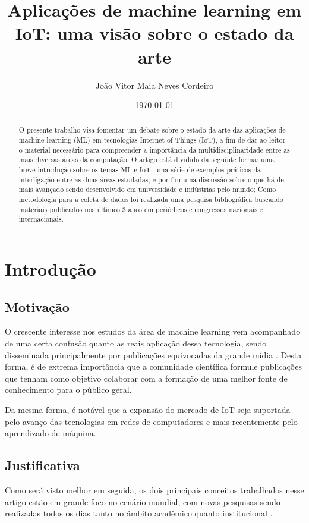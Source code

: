 \documentclass[12pt]{article}
\author{João Vitor Maia Neves Cordeiro}
\title{Aplicações de machine learning em IoT: uma visão sobre o estado da arte}
\date{\today}
\begin{document}
\maketitle

\begin{abstract}

O presente trabalho visa fomentar um debate sobre o estado da arte das aplicações de machine learning (ML) em tecnologias Internet of Things (IoT), a fim de dar ao leitor o material necessário para compreender a importância da multidisciplinaridade entre as mais diversas áreas da computação; O artigo está dividido da seguinte forma: uma breve introdução sobre os temas ML e IoT; uma série de exemplos práticos da interligação entre as duas áreas estudadas; e por fim uma discussão sobre o que há de mais avançado sendo desenvolvido em universidade e indústrias pelo mundo; Como metodologia para a coleta de dados foi realizada uma pesquisa bibliográfica buscando materiais publicados nos últimos 3 anos em periódicos e congressos nacionais e internacionais.

\end{abstract}

\section{Introdução}

\subsection{Motivação}

O crescente interesse nos estudos da área de machine learning vem acompanhado de uma certa confusão quanto as reais aplicação dessa tecnologia, sendo disseminada principalmente por publicações equivocadas da grande mídia \cite{maram}. Desta forma, é de extrema importância que a comunidade científica formule publicações que tenham como objetivo colaborar com a formação de uma melhor fonte de conhecimento para o público geral.

Da mesma forma, é notável que a expansão do mercado de IoT seja suportada pelo avanço das tecnologias em redes de computadores e mais recentemente pelo aprendizado de máquina.

\subsection{Justificativa}

Como será visto melhor em seguida, os dois principais conceitos trabalhados nesse artigo estão em grande foco no cenário mundial, com novas pesquisas sendo realizadas todos os dias tanto no âmbito acadêmico quanto institucional \cite{nguyen}.
\end{document}
